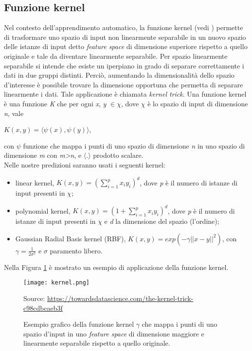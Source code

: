 \subsection{Funzione kernel}
Nel contesto dell'apprendimento automatico, la funzione kernel (vedi \textit{\cite{kernel}}) permette di trasformare uno spazio di input non linearmente separabile in un nuovo spazio delle istanze di input detto \emph{feature space} di dimensione superiore rispetto a quello originale e tale da diventare linearmente separabile. Per spazio linearmente separabile si intende che esiste un iperpiano in grado di separare correttamente i dati in due gruppi distinti. Perciò, aumentando la dimensionalità dello spazio d'interesse è possibile trovare la dimensione opportuna che permetta di separare linearmente i dati. Tale applicazione è chiamata \emph{kernel trick}. Una funzione kernel è una funzione \emph{K} che per ogni \emph{x}, \emph{y} $\in \chi$, dove $\chi$ è lo spazio di input di dimensione \emph{n}, vale 
\begin{center}
	$K(x,y) =  \langle\psi(x),\psi(y)\rangle $,
\end{center}
con $\psi$ funzione che mappa i punti di uno spazio di dimensione \emph{n} in uno spazio di dimensione \emph{m} con \emph{m>n}, e $\langle . \rangle$ prodotto scalare.\\
Nelle nostre predizioni saranno usati i seguenti kernel:
\begin{itemize}
	\item linear kernel, $K(x,y) =  \left(\sum_{i = 1}^{p}x_iy_i\right)^{d} $, dove \emph{p} è il numero di istanze di input presenti in $\chi$;
	\item polynomial kernel, $K(x,y) =  \left(1 + \sum_{i = 1}^{p}x_iy_i\right)^{d} $, dove \emph{p} è il numero di istanze di input presenti in $\chi$ e \emph{d} la dimensione del spazio (l'ordine);
	\item Gaussian Radial Basis kernel (RBF), $K(x,y) = exp(-\gamma||x-y||^2) $, con $\gamma=\frac{1}{2\sigma^2}$ e $\sigma$ paramento libero. 
\end{itemize}

Nella Figura \ref{fig:kernel} è mostrato un esempio di applicazione della funzione kernel.\\

\begin{figure}[h]
	\begin{center}
		\texttt{[image: kernel.png]}
		\caption{Esempio grafico della funzione kernel $\gamma$ che mappa i punti di uno spazio d'input in uno \emph{feature space} di dimensione maggiore e linearmente separabile rispetto a quello originale.
		} 
		Source: \url{https://towardsdatascience.com/the-kernel-trick-c98cdbcaeb3f}\label{fig:kernel}
	\end{center}
\end{figure}

